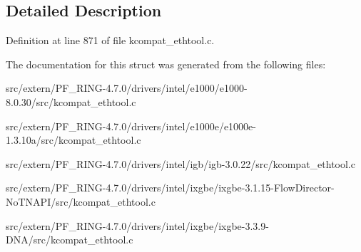 \subsection{Detailed Description}


Definition at line 871 of file kcompat\_\-ethtool.c.



The documentation for this struct was generated from the following files:\begin{DoxyCompactItemize}
\item 
src/extern/PF\_\-RING-\/4.7.0/drivers/intel/e1000/e1000-\/8.0.30/src/kcompat\_\-ethtool.c\item 
src/extern/PF\_\-RING-\/4.7.0/drivers/intel/e1000e/e1000e-\/1.3.10a/src/kcompat\_\-ethtool.c\item 
src/extern/PF\_\-RING-\/4.7.0/drivers/intel/igb/igb-\/3.0.22/src/kcompat\_\-ethtool.c\item 
src/extern/PF\_\-RING-\/4.7.0/drivers/intel/ixgbe/ixgbe-\/3.1.15-\/FlowDirector-\/NoTNAPI/src/kcompat\_\-ethtool.c\item 
src/extern/PF\_\-RING-\/4.7.0/drivers/intel/ixgbe/ixgbe-\/3.3.9-\/DNA/src/kcompat\_\-ethtool.c\end{DoxyCompactItemize}
